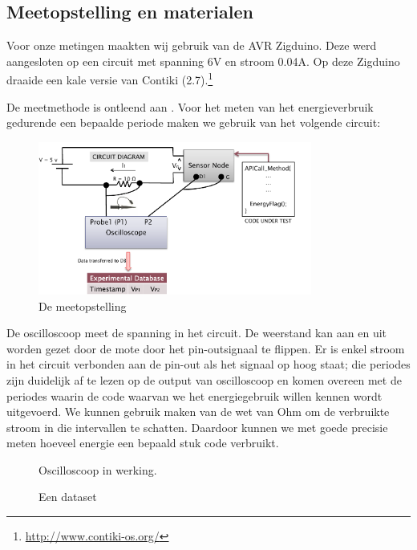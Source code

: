 \documentclass{article}
\begin{document}
\subsection{Meetopstelling en materialen}

Voor onze metingen maakten wij gebruik van de AVR Zigduino. Deze werd
aangesloten op een circuit met spanning 6V en stroom 0.04A.
Op deze Zigduino draaide een kale versie van Contiki (2.7).\footnote{\url{http://www.contiki-os.org/}}

De meetmethode is ontleend aan \cite{hughes2013energy}. Voor het meten van het
energieverbruik gedurende een bepaalde periode maken we gebruik van het volgende
circuit:

\begin{figure}[h]
\centering
\includegraphics[width=9cm]{meetopstelling}
\caption{De meetopstelling }
\label{fig:meetopstelling}
\end{figure}

De oscilloscoop meet de spanning in het circuit. De weerstand kan aan en uit
worden gezet door de mote door het pin-outsignaal te flippen. Er is enkel stroom
in het circuit verbonden aan de pin-out als het signaal op hoog staat; die
periodes zijn duidelijk af te lezen op de output van oscilloscoop en komen
overeen met de periodes waarin de code waarvan we het energiegebruik willen
kennen wordt uitgevoerd. We kunnen gebruik maken van de wet van Ohm om de
verbruikte stroom in die intervallen te schatten. Daardoor kunnen we met goede
precisie meten hoeveel energie een bepaald stuk code verbruikt.
\begin{figure}[h]
\centering
\missingfigure{}
\caption{Oscilloscoop in werking.}
\label{fig:osc_werking}
\end{figure}

\begin{figure}[h]
\centering
\missingfigure{}
\caption{Een dataset}
\label{fig:data}
\end{figure}
\end{document}
